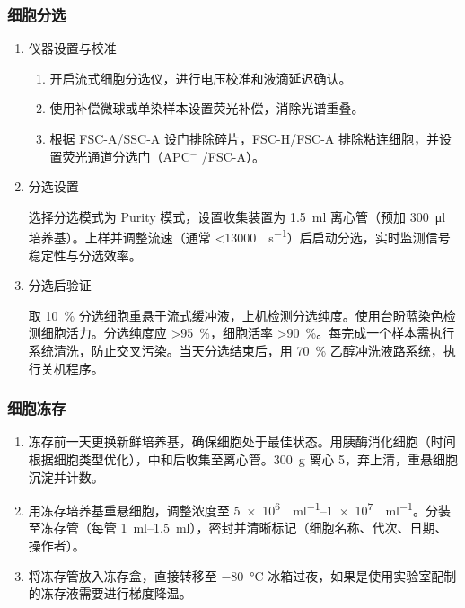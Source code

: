 \subsubsection{细胞分选}
\begin{enumerate}
    \item 仪器设置与校准
    \begin{enumerate}[label=1.\arabic*, leftmargin=*]
        \item 开启流式细胞分选仪，进行电压校准和液滴延迟确认。
        \item 使用补偿微球或单染样本设置荧光补偿，消除光谱重叠。
        \item 根据 FSC-A/SSC-A 设门排除碎片，FSC-H/FSC-A 排除粘连细胞，并设置荧光通道分选门（APC\(^-\) /FSC-A）。
    \end{enumerate}

    \item 分选设置

    选择分选模式为 Purity 模式，设置收集装置为 \qty{1.5}{\ml} 离心管（预加 \qty{300}{\ul} 培养基）。上样并调整流速（通常 <\qty{13000}{\per \s}）后启动分选，实时监测信号稳定性与分选效率。

    \item 分选后验证

    取 \qty{10}{\percent} 分选细胞重悬于流式缓冲液，上机检测分选纯度。使用台盼蓝染色检测细胞活力。分选纯度应 >\qty{95}{\percent}，细胞活率 >\qty{90}{\percent}。每完成一个样本需执行系统清洗，防止交叉污染。当天分选结束后，用 \qty{70}{\percent} 乙醇冲洗液路系统，执行关机程序。
\end{enumerate}

\subsubsection{细胞冻存}
\begin{enumerate}
    \item 冻存前一天更换新鲜培养基，确保细胞处于最佳状态。用胰酶消化细胞（时间根据细胞类型优化），中和后收集至离心管。\qty{300}{g} 离心 \qty{5}{\min}，弃上清，重悬细胞沉淀并计数。
    \item 用冻存培养基重悬细胞，调整浓度至 \qtyrange{5e6}{1e7}{\per \ml}。分装至冻存管（每管 \qtyrange{1}{1.5}{\ml}），密封并清晰标记（细胞名称、代次、日期、操作者）。
    \item 将冻存管放入冻存盒，直接转移至 \qty{-80}{\celsius} 冰箱过夜，如果是使用实验室配制的冻存液需要进行梯度降温。
\end{enumerate}

